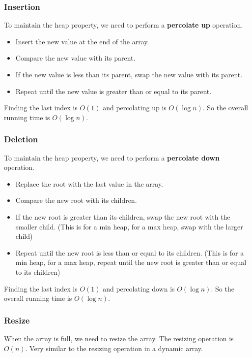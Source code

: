 \documentclass[letterpaper,12pt]{article}
\begin{document}
\subsubsection{Insertion}
To maintain the heap property, we need to perform a \textbf{percolate up} operation. \begin{itemize}
    \item Insert the new value at the end of the array.
    \item Compare the new value with its parent.
    \item If the new value is less than its parent, swap the new value with its parent.
    \item Repeat until the new value is greater than or equal to its parent.
\end{itemize}
Finding the last index is $O(1)$ and percolating up is $O(\log n)$. So the overall running time is $O(\log n)$.
\subsubsection{Deletion}
To maintain the heap property, we need to perform a \textbf{percolate down} operation. \begin{itemize}
    \item Replace the root with the last value in the array.
    \item Compare the new root with its children.
    \item If the new root is greater than its children, swap the new root with the smaller child. (This is for a min heap, for a max heap, swap with the larger child)
    \item Repeat until the new root is less than or equal to its children. (This is for a min heap, for a max heap, repeat until the new root is greater than or equal to its children)
\end{itemize}
Finding the last index is $O(1)$ and percolating down is $O(\log n)$. So the overall running time is $O(\log n)$.
\subsubsection{Resize}
When the array is full, we need to resize the array. The resizing operation is $O(n)$. Very similar to the resizing operation in a dynamic array.
\end{document}
